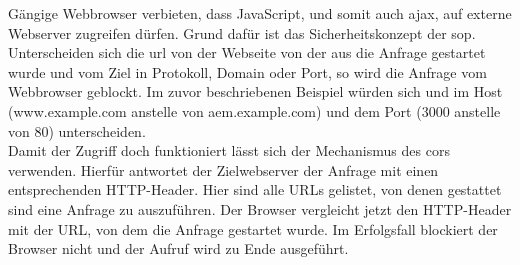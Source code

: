 \label{sec:anpassen-des-webservers}
Gängige Webbrowser verbieten, dass JavaScript, und somit auch \ac{ajax}, auf externe Webserver zugreifen dürfen. Grund dafür ist das Sicherheitskonzept der \ac{sop}. \\
Unterscheiden sich die \ac{url} von der Webseite von der aus die Anfrage gestartet wurde und vom Ziel in Protokoll, Domain oder Port, so wird die Anfrage vom Webbrowser geblockt. Im zuvor beschriebenen Beispiel würden sich \serverA und \serverB im Host (www.example.com anstelle von aem.example.com) und dem Port (3000 anstelle von 80) unterscheiden. \\
Damit der Zugriff doch funktioniert lässt sich der Mechanismus des \ac{cors} verwenden.
Hierfür antwortet der Zielwebserver der Anfrage mit einen entsprechenden HTTP-Header. Hier sind alle URLs gelistet, von denen gestattet sind eine Anfrage zu auszuführen. Der Browser vergleicht jetzt den HTTP-Header mit der URL, von dem die Anfrage gestartet wurde. Im Erfolgsfall blockiert der Browser nicht und der Aufruf wird zu Ende ausgeführt.